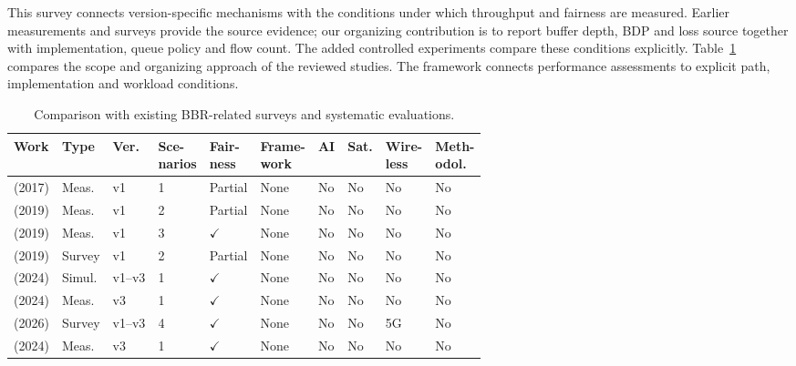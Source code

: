 \documentclass[a4paper,fleqn]{cas-sc}
\begin{document}
This survey connects version-specific mechanisms with the conditions under
which throughput and fairness are measured. Earlier measurements and surveys
provide the source evidence; our organizing contribution is to report buffer
depth, BDP and loss source together with implementation, queue policy and flow
count. The added controlled experiments compare these conditions explicitly.
Table~\ref{tab:survey_compare} compares the scope and organizing approach
of the reviewed studies. The framework connects performance assessments
to explicit path, implementation and workload conditions.

\begin{table}[pos=tbp]
  \caption{Comparison with existing BBR-related surveys and systematic evaluations.}
  \label{tab:survey_compare}
  \footnotesize
  \setlength{\tabcolsep}{3pt}
  \begin{tabularx}{\tblwidth}{@{}p{3.2cm}p{1.4cm}p{1.1cm}p{0.9cm}p{1.0cm}p{1.2cm}p{0.55cm}p{0.55cm}p{0.9cm}p{1.1cm}@{}}
    \toprule
    \textbf{Work} & \textbf{Type} & \textbf{Ver.} & \makecell[l]{\textbf{Sce-}\\\textbf{narios}}
      & \makecell[l]{\textbf{Fair-}\\\textbf{ness}} & \makecell[l]{\textbf{Frame-}\\\textbf{work}} & \textbf{AI} & \textbf{Sat.}
      & \makecell[l]{\textbf{Wire-}\\\textbf{less}} & \makecell[l]{\textbf{Meth-}\\\textbf{odol.}} \\
    \midrule
    \citet{hock2017bbr} (2017) & Meas. & v1 & 1 & Partial & None & No & No & No & No \\
    \citet{cao2019bbr} (2019) & Meas. & v1 & 2 & Partial & None & No & No & No & No \\
    \citet{jaeger2019bbr} (2019) & Meas. & v1 & 3 & $\checkmark$ & None & No & No & No & No \\
    \citet{al2019survey} (2019) & Survey & v1 & 2 & Partial & None & No & No & No & No \\
    \citet{piotrowska2024} (2024) & Simul. & v1--v3 & 1 & $\checkmark$ & None & No & No & No & No \\
    \citet{gomez2024bbrv3} (2024) & Meas. & v3 & 1 & $\checkmark$ & None & No & No & No & No \\
    \citet{abrol2026bbr} (2026) & Survey & v1--v3 & 4 & $\checkmark$ & None & No & No & 5G & No \\
    \citet{zeynali2024bbrv3} (2024) & Meas. & v3 & 1 & $\checkmark$ & None & No & No & No & No \\

\end{tabularx}
\end{table}
\end{document}
